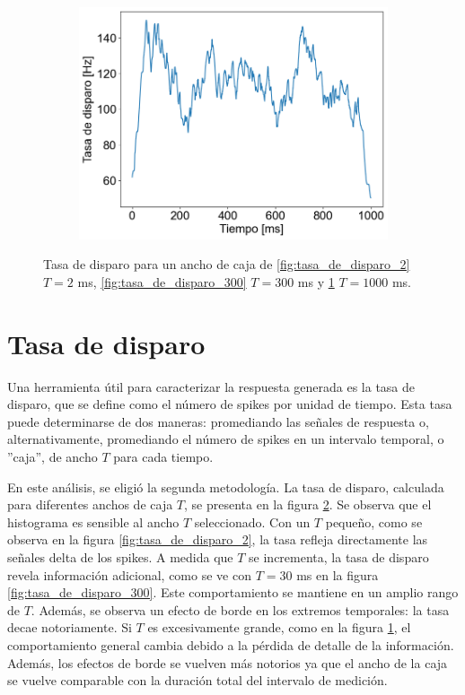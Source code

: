 \documentclass[aps,prb,twocolumn,superscriptaddress,floatfix,longbibliography]{revtex4-2}
\newcounter{para}
\begin{document}
\begin{figure}[h]
\begin{subfigure}[b]{0.35\textwidth}
      \includegraphics[width=\textwidth]{tasa_de_disparo_1000.png}
      \caption{\label{fig:tasa_de_disparo_1000}}
  \end{subfigure}
     \caption{Tasa de disparo para un ancho de caja de \ref{fig:tasa_de_disparo_2} $T = 2$ ms, \ref{fig:tasa_de_disparo_300} $T = 300$ ms y \ref{fig:tasa_de_disparo_1000} $T = 1000$ ms.}
     \label{fig:tasa_de_disparo}
\end{figure}

\section{Tasa de disparo}




Una herramienta útil para caracterizar la respuesta generada es la tasa de disparo, que se define como el número de spikes por unidad de tiempo. Esta tasa puede determinarse de dos maneras: promediando las señales de respuesta o, alternativamente, promediando el número de spikes en un intervalo temporal, o ''caja'', de ancho \(T\) para cada tiempo.

En este análisis, se eligió la segunda metodología. La tasa de disparo, calculada para diferentes anchos de caja \(T\), se presenta en la figura \ref{fig:tasa_de_disparo}. Se observa que el histograma es sensible al ancho \(T\) seleccionado. Con un \(T\) pequeño, como se observa en la figura \ref{fig:tasa_de_disparo_2}, la tasa refleja directamente las señales delta de los spikes. A medida que \(T\) se incrementa, la tasa de disparo revela información adicional, como se ve con \(T = 30\) ms en la figura \ref{fig:tasa_de_disparo_300}. Este comportamiento se mantiene en un amplio rango de $T$. Además, se observa un efecto de borde en los extremos temporales: la tasa decae notoriamente. Si \(T\) es excesivamente grande, como en la figura \ref{fig:tasa_de_disparo_1000}, el comportamiento general cambia debido a la pérdida de detalle de la información. Además, los efectos de borde se vuelven más notorios ya que el ancho de la caja se vuelve comparable con la duración total del intervalo de medición.
\end{document}
